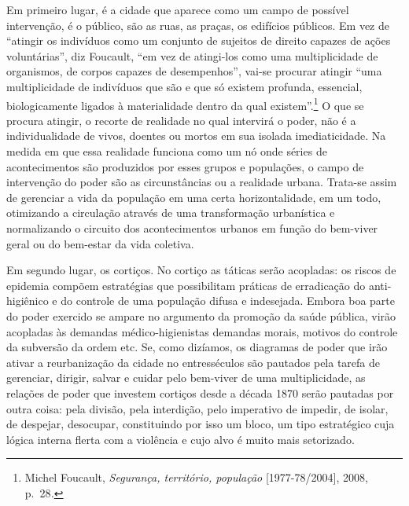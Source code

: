 Em primeiro lugar, é a cidade que aparece como um campo de possível
intervenção, é o público, são as ruas, as praças, os edifícios públicos.
Em vez de ``atingir os indivíduos como um conjunto de sujeitos de
direito capazes de ações voluntárias'', diz Foucault, ``em vez de
atingi-los como uma multiplicidade de organismos, de corpos capazes de
desempenhos'', vai-se procurar atingir ``uma multiplicidade de
indivíduos que são e que só existem profunda, essencial, biologicamente
ligados à materialidade dentro da qual existem''.\footnote{Michel
  Foucault, \textit{Segurança, território, população} {[}1977-78/2004{]},
  2008, p.~28\textit{.}} O que se procura atingir, o recorte de realidade
no qual intervirá o poder, não é a individualidade de vivos, doentes ou
mortos em sua isolada imediaticidade. Na medida em que essa realidade
funciona como um nó onde séries de acontecimentos são produzidos por
esses grupos e populações, o campo de intervenção do poder são as
circunstâncias ou a realidade urbana. Trata-se assim de gerenciar a vida
da população em uma certa horizontalidade, em um todo, otimizando a
circulação através de uma transformação urbanística e normalizando o
circuito dos acontecimentos urbanos em função do bem-viver geral ou do
bem-estar da vida coletiva.

Em segundo lugar, os cortiços. No cortiço as táticas serão acopladas: os
riscos de epidemia compõem estratégias que possibilitam práticas de
erradicação do anti-higiênico e do controle de uma população difusa e
indesejada. Embora boa parte do poder exercido se ampare no argumento da
promoção da saúde pública, virão acopladas às demandas
médico-higienistas demandas morais, motivos do controle da subversão da
ordem etc. Se, como dizíamos, os diagramas de poder que irão ativar a
reurbanização da cidade no entresséculos são pautados pela tarefa de
gerenciar, dirigir, salvar e cuidar pelo bem-viver de uma
multiplicidade, as relações de poder que investem cortiços desde a
década 1870 serão pautadas por outra coisa: pela divisão, pela
interdição, pelo imperativo de impedir, de isolar, de despejar,
desocupar, constituindo por isso um bloco, um tipo estratégico cuja
lógica interna flerta com a violência e cujo alvo é muito mais
setorizado.

